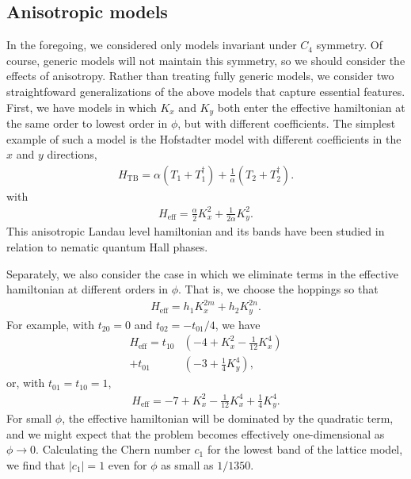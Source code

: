 \documentclass[aps,prb,twocolumn,letterpaper,twoside,nobalancelastpage,groupedaddress,amsmath,amssymb,floatfix,citeautoscript]{revtex4-1}
\begin{document}
\subsection{Anisotropic models}
In the foregoing, we considered only models invariant under $C_4$ symmetry. Of course, generic models will not maintain this symmetry, so we should consider the effects of anisotropy. Rather than treating fully generic models, we consider two straightfoward generalizations of the above models that capture essential features. First, we have models in which $K_x$ and $K_y$ both enter the effective hamiltonian at the same order to lowest order in $\phi$, but with different coefficients. The simplest example of such a model is the Hofstadter model with different coefficients in the $x$ and $y$ directions,
\begin{align}
\label{aniso-tightbinding}
H_{\text{TB}} = \alpha(T_1 + T_1^{\dag}) +  \frac{1}{\alpha}(T_2 + T_2^{\dag}).
\end{align}
 with
\begin{align*}
H_{\text{eff}} = \frac{\alpha}{2} K_x^{2} +  \frac{1}{2\alpha}K_y^{2}.
\end{align*}
This anisotropic Landau level hamiltonian and its bands have been studied in relation to nematic quantum Hall phases.

Separately, we also consider the case in which we eliminate terms in the effective hamiltonian at different orders in $\phi$. That is, we choose the hoppings so that
\begin{align}
H_{\text{eff}} = h_1 K_x^{2m} + h_2 K_y^{2n}.
\end{align}
For example, with $t_{20} = 0$ and $t_{02}=-t_{01}/4$, we have
\begin{align}
H_{\text{eff}} = t_{10}&\left(-4 + K_x^2 - \frac{1}{12}K_x^4\right)\\
+t_{01}&\left(-3+\frac{1}{4}K_y^4\right),
\end{align}
or, with $t_{01}=t_{10}=1$, 
\begin{align}
H_{\text{eff}} = -7 + K_x^2 - \frac{1}{12}K_x^4 +\frac{1}{4}K_y^4.
\end{align}
For small $\phi$, the effective hamiltonian will be dominated by the quadratic term, and we might expect that the problem becomes effectively one-dimensional as $\phi \rightarrow 0$. Calculating the Chern number $c_1$ for the lowest band of the lattice model, we find that $|c_1| = 1$ even for $\phi$ as small as $1/1350$.
\end{document}
